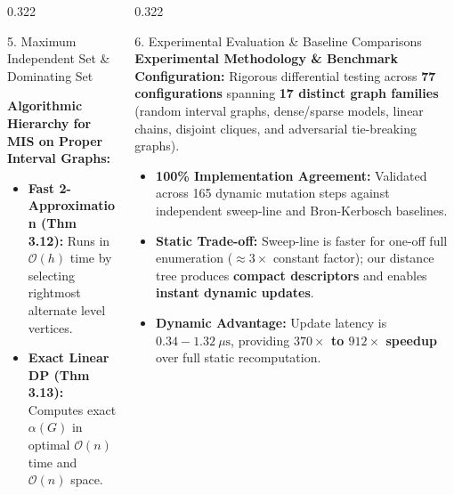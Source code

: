 \documentclass[final,17pt]{beamer}
\begin{document}
\begin{frame}[t]
\begin{columns}[t]
\begin{column}{0.322\textwidth}
\begin{posterbox}{5. Maximum Independent Set \& Dominating Set}
        \vspace{2pt}
        \begin{highlightbox}
            \textbf{Algorithmic Hierarchy for MIS on Proper Interval Graphs:}
            \begin{itemize}\setlength{\itemsep}{1.0pt}
                \fontsize{8.5}{10.6}\selectfont
                \item \textbf{Fast 2-Approximation (Thm 3.12):} Runs in $\mathcal{O}(h)$ time by selecting rightmost alternate level vertices.
                \item \textbf{Exact Linear DP (Thm 3.13):} Computes exact $\alpha(G)$ in optimal $\mathcal{O}(n)$ time and $\mathcal{O}(n)$ space.
            \end{itemize}
        \end{highlightbox}
    \end{posterbox}

\end{column}


\begin{column}{0.322\textwidth}

    \begin{posterbox}{6. Experimental Evaluation \& Baseline Comparisons}
        \textbf{Experimental Methodology \& Benchmark Configuration:}
        Rigorous differential testing across \textbf{77 configurations} spanning \textbf{17 distinct graph families} (random interval graphs, dense/sparse models, linear chains, disjoint cliques, and adversarial tie-breaking graphs).
        \begin{itemize}\setlength{\itemsep}{0.8pt}
            \scriptsize
            \item \textbf{100\% Implementation Agreement:} Validated across 165 dynamic mutation steps against independent sweep-line and Bron-Kerbosch baselines.
            \item \textbf{Static Trade-off:} Sweep-line is faster for one-off full enumeration ($\approx 3\times$ constant factor); our distance tree produces \textbf{compact descriptors} and enables \textbf{instant dynamic updates}.
            \item \textbf{Dynamic Advantage:} Update latency is \textbf{$0.34 - 1.32\ \mu\text{s}$}, providing \textbf{$370\times$ to $912\times$ speedup} over full static recomputation.
        \end{itemize}


\end{posterbox}
\end{column}
\end{columns}
\end{frame}
\end{document}
